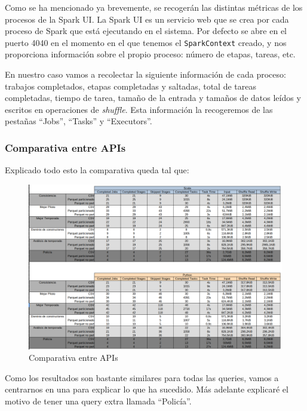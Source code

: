 \documentclass[12pt,twoside,titlepage]{report}
\newcommand{\quotes}[1]{``#1''}
\begin{document}

Como se ha mencionado ya brevemente, se recogerán las distintas métricas de los procesos de la Spark UI. La Spark UI es un servicio web que se crea por cada proceso de Spark que está ejecutando en el sistema. Por defecto se abre en el puerto 4040 en el momento en el que tenemos el \texttt{SparkContext} creado, y nos proporciona información sobre el propio proceso: número de etapas, tareas, etc.

En nuestro caso vamos a recolectar la siguiente información de cada proceso: trabajos completados, etapas completadas y saltadas, total de tareas completadas, tiempo de tarea, tamaño de la entrada y tamaños de datos leídos y escritos en operaciones de \textit{shuffle}. Esta información la recogeremos de las pestañas \quotes{Jobs}, \quotes{Tasks} y \quotes{Executors}.

\subsubsection{Comparativa entre APIs}

Explicado todo esto la comparativa queda tal que:

\begin{figure}[H]
	\includegraphics[scale=0.29]{comparativacompleta.png}
	\centering
	\caption{Comparativa entre APIs}
	\label{fig:completecomparison}
	\centering
\end{figure}

Como los resultados son bastante similares para todas las queries, vamos a centrarnos en una para explicar lo que ha sucedido. Más adelante explicaré el motivo de tener una query extra llamada \quotes{Policía}.
\end{document}
